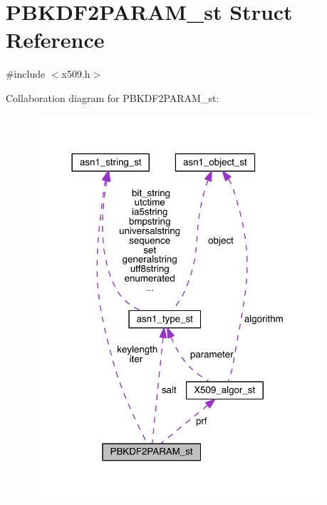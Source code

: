 \hypertarget{struct_p_b_k_d_f2_p_a_r_a_m__st}{}\section{P\+B\+K\+D\+F2\+P\+A\+R\+A\+M\+\_\+st Struct Reference}
\label{struct_p_b_k_d_f2_p_a_r_a_m__st}


{\ttfamily \#include $<$x509.\+h$>$}



Collaboration diagram for P\+B\+K\+D\+F2\+P\+A\+R\+A\+M\+\_\+st\+:\nopagebreak
\begin{figure}[H]
\begin{center}
\leavevmode
\includegraphics[width=302pt]{struct_p_b_k_d_f2_p_a_r_a_m__st__coll__graph}
\end{center}
\end{figure}
